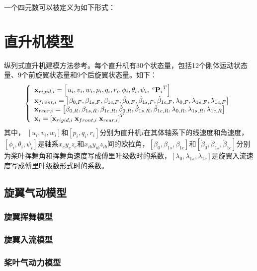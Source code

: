 一个四元数可以被定义为如下形式：
\section{直升机模型}
纵列式直升机建模方法参考\cite{mahmuddin2017rotor,Duan2021Accepted}。每个直升机有30个状态量，包括12个刚体运动状态量、9个前旋翼状态量和9个后旋翼状态量。如下：
\begin{equation}
  \left\{ \begin{array}{l}
      {{\bf{x}}_{rigid,i}} = \left[ {{u_i},{v_i},{w_i},{p_i},{q_i},{r_i},{\phi _i},{\theta _i},{\psi _i},{\;^e}{{\bf{P}}_i}^T} \right]\\
      {{\bf{x}}_{front,i}} = \left[ {{\beta _{0,F}},{\beta _{1s,F}},{\beta _{1c,F}},{{\dot \beta }_{0,F}},{{\dot \beta }_{1s,F}},{{\dot \beta }_{1c,F}},{\lambda _{0,F}},{\lambda _{1s,F}},{\lambda _{1c,F}}} \right]\\
      {{\bf{x}}_{rear,i}} = \left[ {{\beta _{0,R}},{\beta _{1s,R}},{\beta _{1c,R}},{{\dot \beta }_{0,R}},{{\dot \beta }_{1s,R}},{{\dot \beta }_{1c,R}},{\lambda _{0,R}},{\lambda _{1s,R}},{\lambda _{1c,R}}} \right]\\
      {{\bf{x}}_i} = \left[ {{{\bf{x}}_{rigid,i}}\;{{\bf{x}}_{front,i}}\;{{\bf{x}}_{rear,i}}} \right]^T
      \end{array} \right.
\end{equation}
其中， $\left[ {u_i,v_i,w_i} \right]$和$\left[ {p_i,q_i,r_i} \right]$分别为直升机$i$在其体轴系下的线速度和角速度，$\left[ {{\phi _i},{\theta _i},{\psi _i}} \right]$是轴系${x_e}{y_e}{z_e}$和${x_{ib}}{y_{ib}}{z_{ib}}$间的欧拉角，$\left[ {{\beta _0},{\beta _{1s}},{\beta _{1c}}} \right]$和$\left[ {{{\dot \beta }_0},{{\dot \beta }_{1s}},{{\dot \beta }_{1c}}} \right]$分别为桨叶挥舞角和挥舞角速度写成傅里叶级数时的系数，$\left[ {{\lambda _0},{\lambda _{1s}},{\lambda _{1c}}} \right]$是旋翼入流速度写成傅里叶级数形式时的系数。
\subsection{旋翼气动模型}
\subsubsection{旋翼挥舞模型}
\subsubsection{旋翼入流模型}
\subsubsection{桨叶气动力模型}
